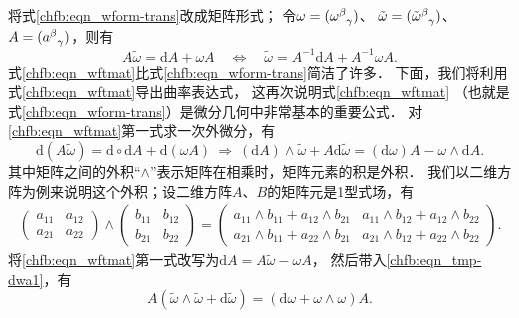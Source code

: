 将式\eqref{chfb:eqn_wform-trans}改成矩阵形式；
令$\omega=(\omega_{\hphantom{\alpha}\gamma}^\beta)$、
$\tilde{\omega}=(\tilde{\omega}_{\hphantom{\alpha}\gamma}^\beta)$、
$A=(a_{\hphantom{\alpha}\gamma}^\beta)$，则有
\begin{equation}\label{chfb:eqn_wftmat}
    A \tilde{\omega}= \mathrm{d}A + \omega A
    \quad \Leftrightarrow \quad
    \tilde{\omega}= A^{-1} \mathrm{d}A + A^{-1}\omega A .
\end{equation}
式\eqref{chfb:eqn_wftmat}比式\eqref{chfb:eqn_wform-trans}简洁了许多．
下面，我们将利用式\eqref{chfb:eqn_wftmat}导出曲率表达式，
这再次说明式\eqref{chfb:eqn_wftmat}
（也就是式\eqref{chfb:eqn_wform-trans}）是微分几何中非常基本的重要公式．
对\eqref{chfb:eqn_wftmat}第一式求一次外微分，有
\begin{equation}\label{chfb:eqn_tmp-dwa1}
    \mathrm{d} (A \tilde{\omega})= \mathrm{d}\circ\mathrm{d}A + \mathrm{d}(\omega A)
    \ \Rightarrow \
    (\mathrm{d} A)\wedge \tilde{\omega}+ A \mathrm{d} \tilde{\omega} 
    =(\mathrm{d}\omega) A - \omega\wedge \mathrm{d} A .
\end{equation}
其中矩阵之间的外积“$\wedge$”表示矩阵在相乘时，矩阵元素的积是外积．
我们以二维方阵为例来说明这个外积；设二维方阵$A$、$B$的矩阵元是1型式场，有
\begin{align*}
	\begin{pmatrix}
		a_{11} & a_{12} \\ a_{21} & a_{22} 
	\end{pmatrix} \wedge
	\begin{pmatrix}
		b_{11} & b_{12} \\ b_{21} & b_{22} 
	\end{pmatrix} 
	=\begin{pmatrix}
		a_{11}\wedge b_{11} + a_{12}\wedge b_{21} & a_{11}\wedge b_{12} + a_{12}\wedge b_{22} \\ 
		a_{21}\wedge b_{11} + a_{22}\wedge b_{21} & a_{21}\wedge b_{12} + a_{22}\wedge b_{22}
	\end{pmatrix}.
\end{align*}
将\eqref{chfb:eqn_wftmat}第一式改写为$\mathrm{d} A = A \tilde{\omega}-\omega A $，
然后带入\eqref{chfb:eqn_tmp-dwa1}，有
\begin{equation}\label{chfb:eqn_ATheta}
    A (\tilde{\omega}\wedge \tilde{\omega} + \mathrm{d} \tilde{\omega} )
    =(\mathrm{d}\omega +  \omega\wedge\omega )A .
\end{equation}


